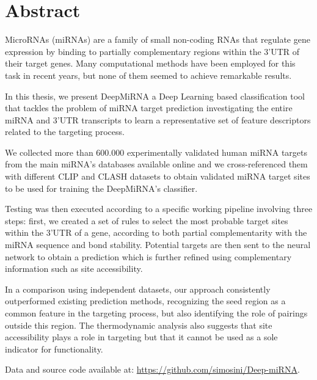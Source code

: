 \chapter*{Abstract}

MicroRNAs (miRNAs) are a family of small non-coding RNAs that regulate gene expression by binding to partially complementary regions within the 3’UTR of their target genes. Many computational methods have been employed for this task in recent years, but none of them seemed to achieve remarkable results.

In this thesis, we present DeepMiRNA a Deep Learning based classification tool that  tackles the problem of miRNA target prediction investigating the entire miRNA and 3'UTR transcripts to learn a representative set of feature descriptors related to the targeting process. 

We collected more than 600.000 experimentally validated human miRNA targets from the main miRNA's databases available online and we cross-referenced them with different CLIP and CLASH datasets to obtain validated mi\-RNA target sites to be used for training the DeepMiRNA's classifier. 

Testing was then executed according to a specific working pipeline involving three steps: first, we created a set of rules to select the most probable target sites within the 3'UTR of a gene, according to both partial complementarity with the miRNA sequence and bond stability. Potential targets are then sent to the neural network to obtain a prediction which is further refined using complementary information such as site accessibility. 

In a comparison using independent datasets, our approach consistently outperformed existing prediction methods, recognizing the seed region as a common feature in the targeting process, but also identifying the role of pairings outside this region. The thermodynamic analysis also suggests that site accessibility plays a role in targeting but that it cannot be used as a sole indicator for functionality.

Data and source code available at: \url{https://github.com/simosini/Deep-miRNA}.